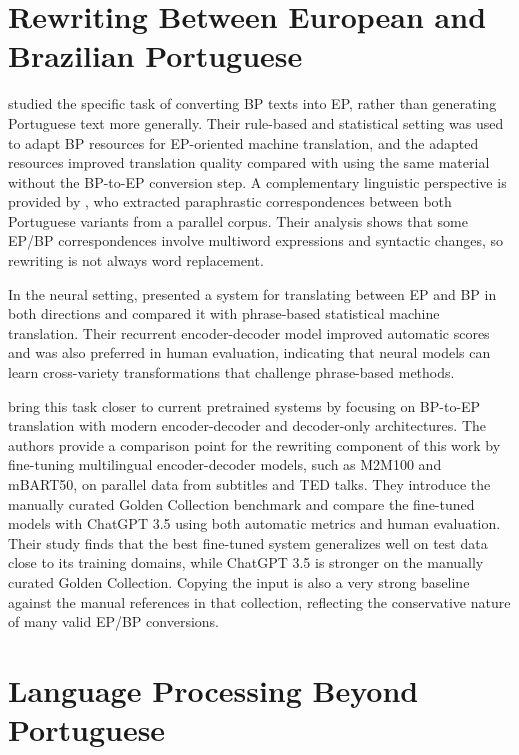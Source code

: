 \section{Rewriting Between European and Brazilian Portuguese}
\label{sec:rw-portuguese-variety-translation}

\citet{marujo-etal-2011-bp2ep} studied the specific task of converting BP texts
into EP, rather than generating Portuguese text more generally. Their
rule-based and statistical setting was used to adapt BP resources for
EP-oriented machine translation, and the adapted resources improved translation
quality compared with using the same material without the BP-to-EP conversion
step. A complementary linguistic perspective is provided by
\citet{barreiro-mota-2018-paraphrastic}, who extracted paraphrastic
correspondences between both Portuguese variants from a parallel corpus. Their analysis shows that some EP/BP correspondences involve multiword
expressions and syntactic changes, so rewriting is not always word replacement.

In the neural setting, \citet{costa-jussa-etal-2018-neural} presented a system
for translating between EP and BP in both directions and compared it with
phrase-based statistical machine translation. Their recurrent encoder-decoder model improved automatic scores and was also
preferred in human evaluation, indicating that neural models can learn
cross-variety transformations that challenge phrase-based methods.

\citet{sanches2024brazilianportugueseeuropeanportuguese} bring this task closer
to current pretrained systems by focusing on BP-to-EP translation with modern
encoder-decoder and decoder-only architectures. The authors provide a
comparison point for the rewriting component of this work by fine-tuning
multilingual encoder-decoder models, such as M2M100 and mBART50, on parallel
data from subtitles and TED talks. They introduce the manually curated Golden
Collection benchmark and compare the fine-tuned models with ChatGPT 3.5 using
both automatic metrics and human evaluation. Their study finds that the best fine-tuned system
generalizes well on test data close to its training domains, while ChatGPT 3.5
is stronger on the manually curated Golden Collection. Copying the input is also a
very strong baseline against the manual references in that collection,
reflecting the conservative nature of many valid EP/BP conversions.

\section{Language Processing Beyond Portuguese}
\label{sec:rw-varieties-beyond-portuguese}

